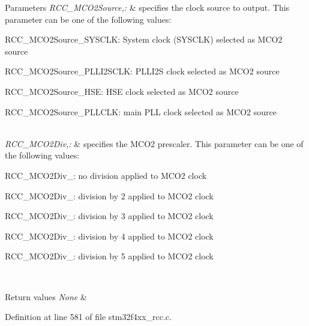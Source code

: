 \begin{DoxyParams}{Parameters}
{\em R\-C\-C\-\_\-\-M\-C\-O2\-Source,\-:} & specifies the clock source to output. This parameter can be one of the following values\-: \begin{DoxyItemize}
\item R\-C\-C\-\_\-\-M\-C\-O2\-Source\-\_\-\-S\-Y\-S\-C\-L\-K\-: System clock (S\-Y\-S\-C\-L\-K) selected as M\-C\-O2 source \item R\-C\-C\-\_\-\-M\-C\-O2\-Source\-\_\-\-P\-L\-L\-I2\-S\-C\-L\-K\-: P\-L\-L\-I2\-S clock selected as M\-C\-O2 source \item R\-C\-C\-\_\-\-M\-C\-O2\-Source\-\_\-\-H\-S\-E\-: H\-S\-E clock selected as M\-C\-O2 source \item R\-C\-C\-\_\-\-M\-C\-O2\-Source\-\_\-\-P\-L\-L\-C\-L\-K\-: main P\-L\-L clock selected as M\-C\-O2 source \end{DoxyItemize}
\\
\hline
{\em R\-C\-C\-\_\-\-M\-C\-O2\-Div,\-:} & specifies the M\-C\-O2 prescaler. This parameter can be one of the following values\-: \begin{DoxyItemize}
\item R\-C\-C\-\_\-\-M\-C\-O2\-Div\-\_\-: no division applied to M\-C\-O2 clock \item R\-C\-C\-\_\-\-M\-C\-O2\-Div\-\_\-: division by 2 applied to M\-C\-O2 clock \item R\-C\-C\-\_\-\-M\-C\-O2\-Div\-\_\-: division by 3 applied to M\-C\-O2 clock \item R\-C\-C\-\_\-\-M\-C\-O2\-Div\-\_\-: division by 4 applied to M\-C\-O2 clock \item R\-C\-C\-\_\-\-M\-C\-O2\-Div\-\_\-: division by 5 applied to M\-C\-O2 clock \end{DoxyItemize}
\\
\hline
\end{DoxyParams}

\begin{DoxyRetVals}{Return values}
{\em None} & \\
\hline
\end{DoxyRetVals}


Definition at line 581 of file stm32f4xx\-\_\-rcc.\-c.

